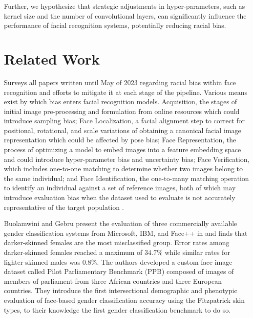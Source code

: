 \documentclass[conference]{IEEEtran}
\begin{document}
Further, we hypothesize that strategic adjustments in hyper-parameters, such as kernel size and the number of convolutional layers, can significantly influence the performance of facial recognition systems, potentially reducing racial bias.

\section{Related Work}
\cite{yucer2023racial} Surveys all papers written until May of 2023 regarding racial bias within face recognition and efforts to mitigate it at each stage of the pipeline. Various means exist by which bias enters facial recognition models. Acquisition, the stages of initial image pre-processing and formulation from online resources which could introduce sampling bias; Face Localization, a facial alignment step to correct for positional, rotational, and scale variations of obtaining a canonical facial image representation which could be affected by pose bias; Face Representation, the process of optimizing a model to embed images into a feature embedding space and could introduce hyper-parameter bias and uncertainty bias; Face Verification, which includes one-to-one matching to determine whether two images belong to the same individual; and Face Identification, the one-to-many matching operation to identify an individual against  a set of reference images, both of which may introduce evaluation bias when the dataset used to evaluate is not accurately representative of the target population \cite{suresh2021framework}.

Buolamwini and Gebru present the evaluation of three commercially available gender classification systems from Microsoft, IBM, and Face++ in\cite{pmlr-v81-buolamwini18a} and finds that darker-skinned females are the most misclassified group. Error rates among darker-skinned females reached a maximum of 34.7\% while similar rates for lighter-skinned males was 0.8\%. The authors developed a custom face image dataset called Pilot Parliamentary Benchmark (PPB) composed of images of members of parliament from three African countries and three European countries. They introduce the first intersectional demographic and phenotypic evaluation of face-based gender classification accuracy using the Fitzpatrick skin types\cite{fitzpatrick1988validity}, to their knowledge the first gender classification benchmark to do so. 
\end{document}
